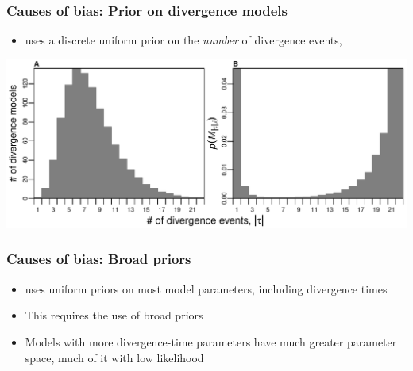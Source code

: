 \begin{frame}
    \frametitle{Causes of bias: Prior on divergence models}
    \begin{itemize}
        \item \msb uses a discrete uniform prior on the \emph{number} of
            divergence events, \divTimeNum
    \end{itemize}
    \centerline{
    \includegraphics[width=\textwidth]{../images/partition_numbers.pdf}}
\end{frame}

\begin{frame}
    \frametitle{Causes of bias: Broad priors}
    \begin{itemize}
        \item<1-> \msb uses uniform priors on most model parameters, including
            divergence times
        \item<2-> This requires the use of broad priors
        \item<3-> Models with more divergence-time parameters have much greater
            parameter space, much of it with low likelihood
    \end{itemize}
\end{frame}

